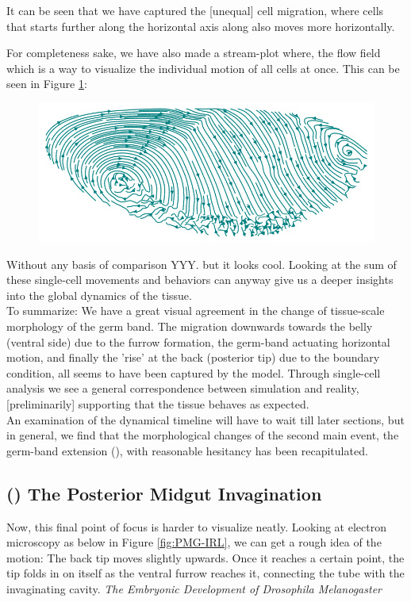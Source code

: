 It can be seen that we have captured the [unequal] cell migration, where cells that starts further along the horizontal axis along also moves more horizontally. 

For completeness sake, we have also made a stream-plot where, the flow field which is a way to visualize the individual motion of all cells at once. This can be seen in Figure \ref{fig:streamplot}:


\begin{figure}[H]
    \centering
    \includegraphics[width=1\linewidth]{chapters/Results/figures/streamplot2.png}
    \caption{}
    \label{fig:streamplot}
\end{figure}

Without any basis of comparison YYY.  but it looks cool.
Looking at the sum of these single-cell movements and behaviors can anyway give us a deeper insights into the global dynamics of the tissue.\\

To summarize: We have a great visual agreement in the change of tissue-scale morphology of the germ band. The migration downwards towards the belly (ventral side) due to the furrow formation, the germ-band actuating horizontal motion, and finally the 'rise' at the back (posterior tip) due to the boundary condition, all seems to have been captured by the model. Through single-cell analysis we see a general correspondence between simulation and reality, [preliminarily] supporting that the tissue behaves as expected.\\  


An examination of the dynamical timeline will have to wait till later sections, but in general, we find that the morphological changes of the second main event, the germ-band extension (), with reasonable hesitancy has been recapitulated.


\subsection{() The Posterior Midgut Invagination }
Now, this final point of focus is harder to visualize neatly. Looking at electron microscopy as below in Figure \ref{fig:PMG-IRL}, we can get a rough idea of the motion:
The back tip moves slightly upwards. Once it reaches a certain point, the tip folds in on itself as the ventral furrow reaches it, connecting the tube with the invaginating cavity. \textit{The Embryonic Development of Drosophila Melanogaster}

